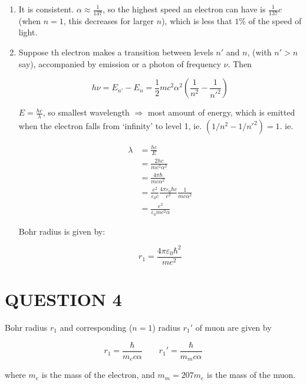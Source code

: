\documentclass[a4paper]{article}
\begin{document}
\begin{enumerate}
	\item It is consistent. $ \alpha \approx \frac{1}{137} $, so the highest speed an electron can have is $ \frac{1}{137}  c$ (when $ n = 1 $, this decreases for larger $ n $), which is less that $ 1 \% $ of the speed of light.

	
	
	\item Suppose th electron makes a transition between levels $ n' $ and $ n $, (with $ n' > n $ say), accompanied by emission or a photon of frequency $ \nu $. Then
	
	\[ h \nu = E_{n'} - E_{n} = \frac{1}{2} m c^{2} \alpha^{2} \left(  \frac{1}{n^{2}} - \frac{1}{n'^{2}} \right)  \]
	
	  $ E = \frac{hc}{\lambda} $, so smallest wavelength $ \Rightarrow $ most amount of energy, which is emitted when the electron falls from `infinity' to level 1, ie. $ (1/n^{2} - 1/n'^{2} ) = 1 $. ie.
	  
	  \begin{align*}
	  \lambda & = \frac{hc}{E}  \\
	  & = \frac{2hc}{mc^{2}\alpha^{2} } \\
	  & = \frac{4\pi \hbar }{mc \alpha^{2}} \\
	  & =  \frac{e^{2}}{\varepsilon_{0} c}\frac{4\pi \varepsilon_{0} \hbar c }{e^{2}} \frac{1}{mc \alpha^{2}} \\
	  & = \frac{e^{2}}{\varepsilon_{0} m c^{2} \alpha }
	  \end{align*}
	  
	  Bohr radius is given by:
	  
	  \[ r_{1} = \frac{4 \pi \varepsilon_{0} \hbar^{2}}{m e^{2}} \]
	
\end{enumerate}








\section{QUESTION 4}

Bohr radius $ r_{1} $ and corresponding ($ n=1 $) radius $ r_{1}' $ of muon are given by 

\[ r_{1} = \frac{\hbar}{m_{e} c \alpha} \qquad r_{1}'  = \frac{\hbar}{m_{m} c \alpha} \]

where $ m_{e} $ is the mass of the electron, and $ m_{m} = 207 m_{e} $ is the mass of the muon.
\end{document}
